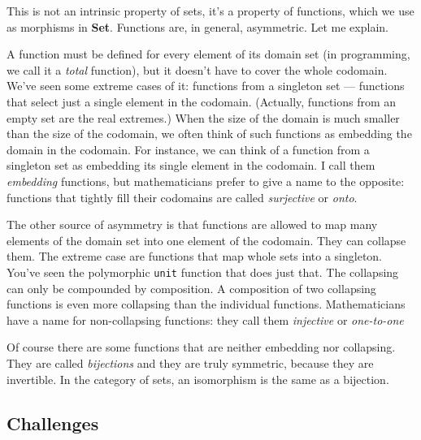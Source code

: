 This is not an intrinsic property of sets, it's a property of functions,
which we use as morphisms in \textbf{Set}. Functions are, in general,
asymmetric. Let me explain.

A function must be defined for every element of its domain set (in
programming, we call it a \emph{total} function), but it doesn't have to
cover the whole codomain. We've seen some extreme cases of it: functions
from a singleton set --- functions that select just a single element in
the codomain. (Actually, functions from an empty set are the real
extremes.) When the size of the domain is much smaller than the size of
the codomain, we often think of such functions as embedding the domain
in the codomain. For instance, we can think of a function from a
singleton set as embedding its single element in the codomain. I call
them \emph{embedding} functions, but mathematicians prefer to give a
name to the opposite: functions that tightly fill their codomains are
called \emph{surjective} or \emph{onto}.

The other source of asymmetry is that functions are allowed to map many
elements of the domain set into one element of the codomain. They can
collapse them. The extreme case are functions that map whole sets into a
singleton. You've seen the polymorphic \texttt{unit} function that does
just that. The collapsing can only be compounded by composition. A
composition of two collapsing functions is even more collapsing than the
individual functions. Mathematicians have a name for non-collapsing
functions: they call them \emph{injective} or \emph{one-to-one}

Of course there are some functions that are neither embedding nor
collapsing. They are called \emph{bijections} and they are truly
symmetric, because they are invertible. In the category of sets, an
isomorphism is the same as a bijection.

\subsection{Challenges}\label{challenges}

